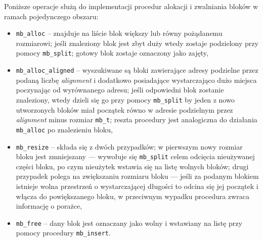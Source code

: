 \documentclass[12pt,a4paper,titlepage,twoside]{mwart}
\begin{document}
Poniższe operacje służą do implementacji procedur alokacji i zwalniania bloków
w ramach pojedynczego obszaru:
\begin{itemize}
\item \verb+mb_alloc+ -- znajduje na liście blok większy lub równy pożądanemu
rozmiarowi; jeśli znaleziony blok jest zbyt duży wtedy zostaje podzielony przy
pomocy \verb+mb_split+; gotowy blok zostaje oznaczony jako zajęty,
\item \verb+mb_alloc_aligned+ -- wyszukiwane są bloki zawierające adresy
podzielne przez podaną liczbę \textit{alignment} i dodatkowo posiadające
wystarczająco dużo miejsca poczynając od wyrównanego adresu; jeśli odpowiedni
blok zostanie znaleziony, wtedy dzieli się go przy pomocy \verb+mb_split+ by
jeden z nowo utworzonych bloków miał początek równo w adresie podzielnym przez
\textit{alignment} minus rozmiar \verb+mb_t+; reszta procedury jest analogiczna
do działania \verb+mb_alloc+ po znalezieniu bloku,
\item \verb+mb_resize+ -- składa się z dwóch przypadków; w pierwszym nowy
rozmiar bloku jest zmniejszany --- wywołuje się \verb+mb_split+ celem odcięcia
nieużywanej części bloku, po czym nieużytek wstawia się na listę wolnych
bloków; drugi przypadek polega na zwiększaniu rozmiaru bloku --- jeśli za
podanym blokiem istnieje wolna przestrzeń o wystarczającej długości to odcina
się jej początek i włącza do powiększanego bloku, w przeciwnym wypadku
procedura zwraca informację o porażce,
\item \verb+mb_free+ -- dany blok jest oznaczany jako wolny i wstawiany na
listę przy pomocy procedury \verb+mb_insert+.
\end{itemize}
\end{document}
